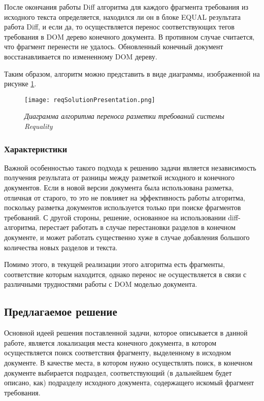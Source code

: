 После окончания работы Diff алгоритма для каждого фрагмента требования из исходного текста определяется, находился ли он в блоке EQUAL результата работа Diff, и если да, то осуществляется перенос соответствующих тегов требования в DOM дерево конечного документа. В противном случае считается, что фрагмент перенести не удалось. Обновленный конечный документ восстанавливается по измененному DOM дереву.

Таким образом, алгоритм можно представить в виде диаграммы, изображенной на рисунке \ref{pr:image6}.

\begin{figure}[h]
\begin{center}
\texttt{[image: reqSolutionPresentation.png]}
\caption{\emph{Диаграмма алгоритма переноса разметки требований системы Requality}}
\label{pr:image6}
\end{center}
\end{figure}

\subsubsection{Характеристики}

Важной особенностью такого подхода к решению задачи является независимость получения результата от разницы между разметкой исходного и конечного документов. Если в новой версии документа была использована разметка, отличная от старого, то это не повлияет на эффективность работы алгоритма, поскольку разметка документов используется только при поиске фрагментов требований. С другой стороны, решение, основанное на использовании diff-алгоритма, перестает работать в случае перестановки разделов в конечном документе, и может работать существенно хуже в случае добавления большого количества новых разделов и текста.

Помимо этого, в текущей реализации этого алгоритма есть фрагменты, соответствие которым находится, однако перенос не осуществляется в связи с различными трудностями работы с DOM моделью документа.

\subsection{Предлагаемое решение}

Основной идеей решения поставленной задачи, которое описывается в данной работе, является локализация места конечного документа, в котором осуществляется поиск соответствия фрагменту, выделенному в исходном документе. В качестве места, в котором нужно осуществлять поиск, в конечном документе выбирается подраздел, соответствующий (в дальнейшем будет описано, как) подразделу исходного документа, содержащего искомый фрагмент требования.


